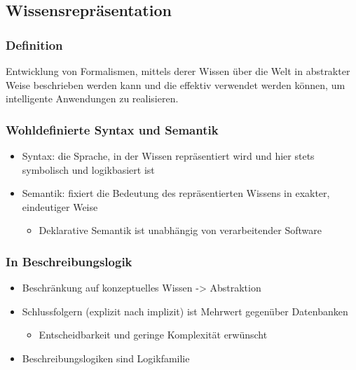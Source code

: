 \subsection{Wissensrepräsentation}\label{wissensrepruxe4sentation}

\subsubsection{Definition}\label{definition}

Entwicklung von Formalismen, mittels derer Wissen über die Welt in
abstrakter Weise beschrieben werden kann und die effektiv verwendet
werden können, um intelligente Anwendungen zu realisieren.

\subsubsection{Wohldefinierte Syntax und
Semantik}\label{wohldefinierte-syntax-und-semantik}

\begin{itemize}
\item
  Syntax: die Sprache, in der Wissen repräsentiert wird und hier stets
  symbolisch und logikbasiert ist
\item
  Semantik: fixiert die Bedeutung des repräsentierten Wissens in
  exakter, eindeutiger Weise

  \begin{itemize}
  \item
    Deklarative Semantik ist unabhängig von verarbeitender Software
  \end{itemize}
\end{itemize}

\subsubsection{In Beschreibungslogik}\label{in-beschreibungslogik}

\begin{itemize}
\item
  Beschränkung auf konzeptuelles Wissen -\textgreater{} Abstraktion
\item
  Schlussfolgern (explizit nach implizit) ist Mehrwert gegenüber
  Datenbanken

  \begin{itemize}
  \item
    Entscheidbarkeit und geringe Komplexität erwünscht
  \end{itemize}
\item
  Beschreibungslogiken sind Logikfamilie

\end{itemize}

